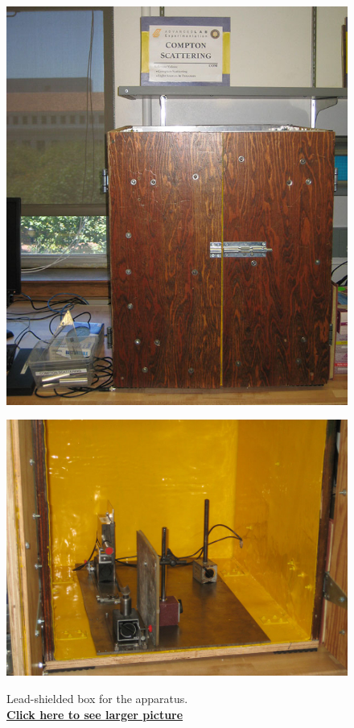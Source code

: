 \documentclass{../lab}
\begin{document}
\begin{figure}[H]
\begin{minipage}{.49\linewidth}
    \centering
    \href{http://experimentationlab.berkeley.edu/sites/default/files/images/COM_3526-Lg.JPG}{\includegraphics[width=\linewidth,keepaspectratio]{images/COM_3526-Lg.JPG}} \\
    \caption{Lead-shielded box for the apparatus. \\ \href{http://experimentationlab.berkeley.edu/sites/default/files/images/COM_3526-Lg.JPG}{\textbf{Click here to see larger picture}}}
\end{minipage}\hfill
\begin{minipage}{.49\linewidth}
    \centering
    \href{http://experimentationlab.berkeley.edu/sites/default/files/images/COM_Inside_3525-Lg.JPG}{\includegraphics[width=\linewidth,keepaspectratio]{images/COM_Inside_3525-Lg.JPG}} \\

\end{minipage}
\end{figure}
\end{document}
